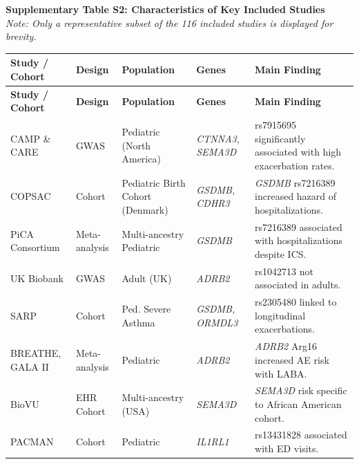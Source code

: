 \documentclass[11pt,a4paper]{article}
\begin{document}
\noindent\textbf{Supplementary Table S2: Characteristics of Key Included Studies} \\
\textit{Note: Only a representative subset of the 116 included studies is displayed for brevity.}
\small\begin{center}\begin{longtable}{@{}p{2.5cm}p{1.2cm}p{2.5cm}p{2cm}p{4.3cm}@{}}
\toprule
\textbf{Study / Cohort} & \textbf{Design}  & \textbf{Population} & \textbf{Genes} & \textbf{Main Finding} \\
\midrule
\endfirsthead
\midrule
\textbf{Study / Cohort} & \textbf{Design}  & \textbf{Population} & \textbf{Genes} & \textbf{Main Finding} \\
\midrule
\endhead
\bottomrule
\endfoot
\bottomrule
\endlastfoot
CAMP \& CARE \cite{McGeachieWu2015} & GWAS & Pediatric (North America) & \textit{CTNNA3, SEMA3D} & rs7915695 significantly associated with high exacerbation rates. \\
COPSAC \cite{ParkTantisira2017} & Cohort & Pediatric Birth Cohort (Denmark) & \textit{GSDMB, CDHR3} & \textit{GSDMB} rs7216389 increased hazard of hospitalizations. \\
PiCA Consortium \cite{FarzanVijverberg2018} & Meta-analysis & Multi-ancestry Pediatric & \textit{GSDMB} & rs7216389 associated with hospitalizations despite ICS. \\
UK Biobank \cite{FawcettHall2025} & GWAS & Adult (UK) & \textit{ADRB2} & rs1042713 not associated in adults. \\
SARP \cite{LiChristenson2021} & Cohort & Ped. Severe Asthma & \textit{GSDMB, ORMDL3} & rs2305480 linked to longitudinal exacerbations. \\
BREATHE, GALA II \cite{TurnerFrancis2016} & Meta-analysis & Pediatric & \textit{ADRB2} & \textit{ADRB2} Arg16 increased AE risk with LABA. \\
BioVU \cite{McGeachieWu2015} & EHR Cohort & Multi-ancestry (USA) & \textit{SEMA3D} & \textit{SEMA3D} risk specific to African American cohort. \\
PACMAN \cite{DijkVijverberg2019} & Cohort & Pediatric & \textit{IL1RL1} & rs13431828 associated with ED visits. \\
\end{longtable}\end{center}
\end{document}

